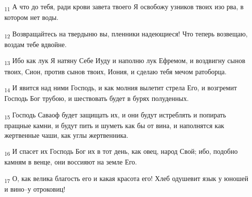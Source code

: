 \begin{tcolorbox}
\textsubscript{11} А что до тебя, ради крови завета твоего Я освобожу узников твоих изо рва, в котором нет воды.
\end{tcolorbox}
\begin{tcolorbox}
\textsubscript{12} Возвращайтесь на твердыню вы, пленники надеющиеся! Что теперь возвещаю, воздам тебе вдвойне.
\end{tcolorbox}
\begin{tcolorbox}
\textsubscript{13} Ибо как лук Я натяну Себе Иуду и наполню лук Ефремом, и воздвигну сынов твоих, Сион, против сынов твоих, Иония, и сделаю тебя мечом ратоборца.
\end{tcolorbox}
\begin{tcolorbox}
\textsubscript{14} И явится над ними Господь, и как молния вылетит стрела Его, и возгремит Господь Бог трубою, и шествовать будет в бурях полуденных.
\end{tcolorbox}
\begin{tcolorbox}
\textsubscript{15} Господь Саваоф будет защищать их, и они будут истреблять и попирать пращные камни, и будут пить и шуметь как бы от вина, и наполнятся как жертвенные чаши, как углы жертвенника.
\end{tcolorbox}
\begin{tcolorbox}
\textsubscript{16} И спасет их Господь Бог их в тот день, как овец, народ Свой; ибо, подобно камням в венце, они воссияют на земле Его.
\end{tcolorbox}
\begin{tcolorbox}
\textsubscript{17} О, как велика благость его и какая красота его! Хлеб одушевит язык у юношей и вино--у отроковиц!
\end{tcolorbox}
